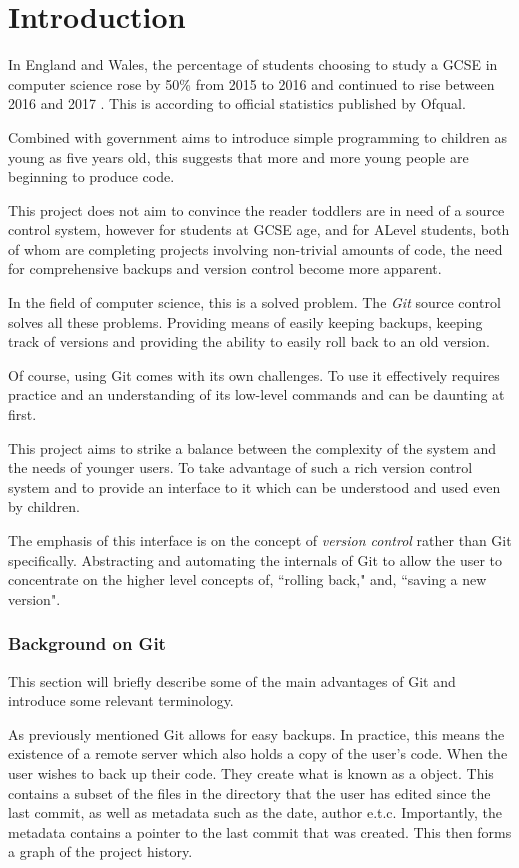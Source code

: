 \chapter{Introduction}

In England and Wales, the percentage of students choosing to study a GCSE in computer science rose by 50\% from 2015 to 2016 and continued to rise between 2016 and 2017 \cite{ofqual}. This is according to official statistics published by Ofqual.

Combined with government aims to introduce simple programming to children as young as five years old, this suggests that more and more young people are beginning to produce code.

This project does not aim to convince the reader toddlers are in need of a source control system, however for students at GCSE age, and for ALevel students, both of whom are completing projects involving non-trivial amounts of code, the need for comprehensive backups and version control become more apparent.

In the field of computer science, this is a solved problem. The \emph{Git} source control solves all these problems. Providing means of easily keeping backups, keeping track of versions and providing the ability to easily roll back to an old version.

Of course, using Git comes with its own challenges. To use it effectively requires practice and an understanding of its low-level commands and can be daunting at first.

This project aims to strike a balance between the complexity of the system and the needs of younger users. To take advantage of such a rich version control system and to provide an interface to it which can be understood and used even by children.

The emphasis of this interface is on the concept of \emph{version control} rather than Git specifically. Abstracting and automating the internals of Git to allow the user to concentrate on the higher level concepts of, ``rolling back," and, ``saving a new version".

\subsection{Background on Git}

This section will briefly describe some of the main advantages of Git and introduce some relevant terminology. 

As previously mentioned Git allows for easy backups. In practice, this means the existence of a remote server which also holds a copy of the user's code. When the user wishes to back up their code. They create what is known as a \commit object. This contains a subset of the files in the directory that the user has edited since the last commit, as well as metadata such as the date, author e.t.c. Importantly, the metadata contains a pointer to the last commit that was created. This then forms a graph of the project history.

